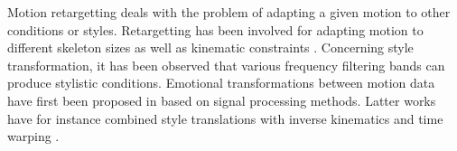 Motion retargetting deals with the problem of adapting a given motion to other conditions or styles. Retargetting has been involved for adapting motion to different skeleton sizes  as well as kinematic constraints . Concerning style transformation, it has been observed that various frequency filtering bands can produce stylistic conditions. Emotional transformations between motion data have first been proposed in  based on signal processing methods. Latter works have for instance combined style translations with inverse kinematics  and time warping .








